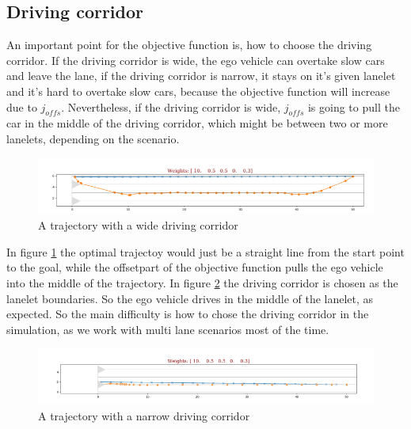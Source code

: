 \documentclass[conference]{IEEEtran}
\begin{document}
\subsection{Driving corridor}
An important point for the objective function is, how to choose the driving corridor. If the driving corridor is wide, the ego vehicle can overtake slow cars and leave the lane, if the driving corridor is narrow, it stays on it's given lanelet and it's hard to overtake slow cars, because the objective function will increase due to $j_{offs}$. Nevertheless, if the driving corridor is wide, $j_{offs}$  is going to pull the car in the middle of the driving corridor, which might be between two or more lanelets, depending on the scenario.
\begin{figure}[h]
\includegraphics[scale = 0.3]{placeholderdc1.png}
\caption{A trajectory with a wide driving corridor}
\label{ph1}
\end{figure}
In figure \ref{ph1} the optimal trajectoy would just be a straight line from the start point to the goal, while the offsetpart of the objective function pulls the ego vehicle into the middle of the trajectory.
In figure \ref{ph2} the driving corridor is chosen as the lanelet boundaries. So the ego vehicle drives in the middle of the lanelet, as expected.
So the main difficulty is how to chose the driving corridor in the simulation, as we work with multi lane scenarios most of the time. 
\begin{figure}[h]
\begin{center}
\includegraphics[scale = 0.3]{placeholderdc2.png}
\end{center}
\caption{A trajectory with a narrow driving corridor}
\label{ph2}
\end{figure}
\end{document}

